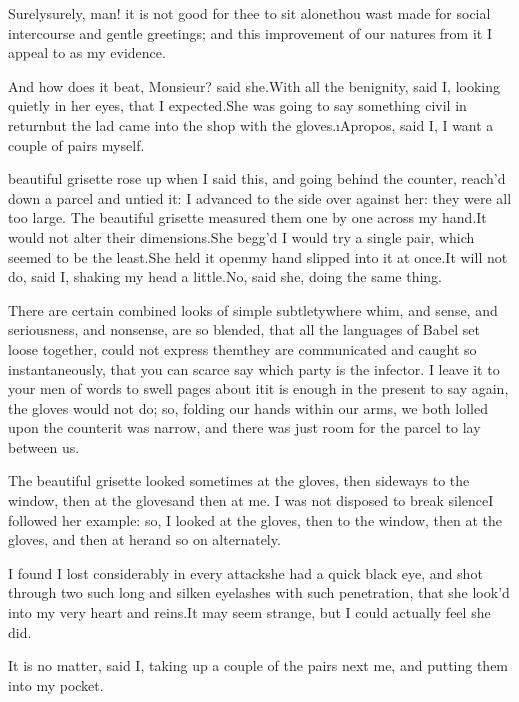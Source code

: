 \documentclass[twoside]{article}
\begin{document}
\tsk Surely\tsk surely, man! it is not good for thee to sit alone\tsk thou wast
made for social intercourse and gentle greetings; and this improvement of
our natures from it I appeal to as my evidence.

\tsk And how does it beat, Monsieur? said she.\tsk With all the benignity, said
I, looking quietly in her eyes, that I expected.\tsk She was going to say
something civil in return\tsk but the lad came into the shop with the
gloves.\tsk \i{Apropos}, said I, I want a couple of pairs myself.






 beautiful grisette rose up when I said this, and going behind the
counter, reach’d down a parcel and untied it: I advanced to the side over
against her: they were all too large.  The beautiful grisette measured
them one by one across my hand.\tsk It would not alter their dimensions.\tsk She
begg’d I would try a single pair, which seemed to be the least.\tsk She held
it open\tsk my hand slipped into it at once.\tsk It will not do, said I, shaking
my head a little.\tsk No, said she, doing the same thing.

There are certain combined looks of simple subtlety\tsk where whim, and
sense, and seriousness, and nonsense, are so blended, that all the
languages of Babel set loose together, could not express them\tsk they are
communicated and caught so instantaneously, that you can scarce say which
party is the infector.  I leave it to your men of words to swell pages
about it\tsk it is enough in the present to say again, the gloves would not
do; so, folding our hands within our arms, we both lolled upon the
counter\tsk it was narrow, and there was just room for the parcel to lay
between us.

The beautiful grisette looked sometimes at the gloves, then sideways to
the window, then at the gloves\tsk and then at me.  I was not disposed to
break silence\tsk I followed her example: so, I looked at the gloves, then
to the window, then at the gloves, and then at her\tsk and so on
alternately.

I found I lost considerably in every attack\tsk she had a quick black eye,
and shot through two such long and silken eyelashes with such
penetration, that she look’d into my very heart and reins.\tsk It may seem
strange, but I could actually feel she did.\tsk 

It is no matter, said I, taking up a couple of the pairs next me, and
putting them into my pocket.
\end{document}
